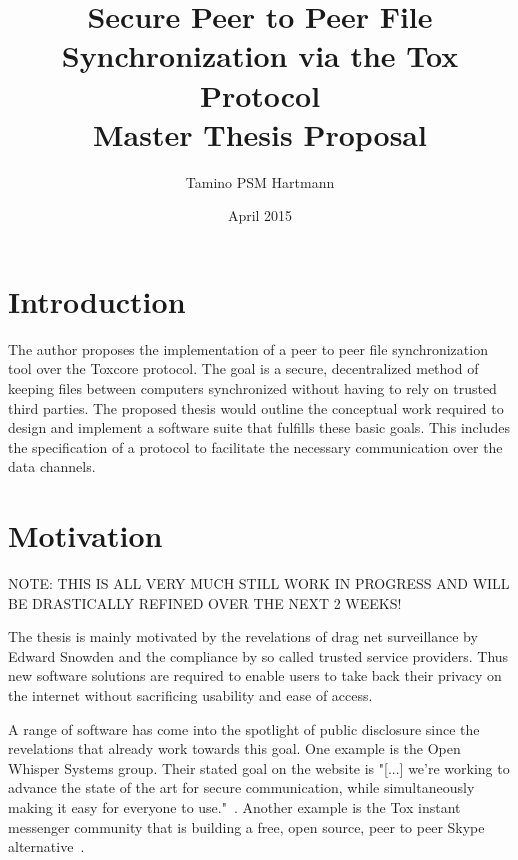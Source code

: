 \documentclass[a4paper,10pt,twoside]{article}
\begin{document}
\title{\textbf{Secure Peer to Peer File Synchronization via the Tox Protocol}\\{\Large Master Thesis Proposal}}
\author{Tamino PSM Hartmann}
\date{April 2015}
\maketitle

\setcounter{secnumdepth}{0}
\pagestyle{headings}

\section{Introduction}

The author proposes the implementation of a peer to peer file synchronization tool over the Toxcore protocol.
The goal is a secure, decentralized method of keeping files between computers synchronized without having to rely on trusted third parties.
The proposed thesis would outline the conceptual work required to design and implement a software suite that fulfills these basic goals.
This includes the specification of a protocol to facilitate the necessary communication over the data channels.

\section{Motivation}

NOTE: THIS IS ALL VERY MUCH STILL WORK IN PROGRESS AND WILL BE DRASTICALLY REFINED OVER THE NEXT 2 WEEKS!


The thesis is mainly motivated by the revelations of drag net surveillance by Edward Snowden and the compliance by so called trusted service providers.
Thus new software solutions are required to enable users to take back their privacy on the internet without sacrificing usability and ease of access.

A range of software has come into the spotlight of public disclosure since the revelations that already work towards this goal.
One example is the Open Whisper Systems group.
Their stated goal on the website is "[...] we're working to advance the state of the art for secure communication, while simultaneously making it easy for everyone to use."~\cite{web:site:whispersystems:about}.
Another example is the Tox instant messenger community that is building a free, open source, peer to peer Skype alternative~\cite{web:site:tox}.
\end{document}

